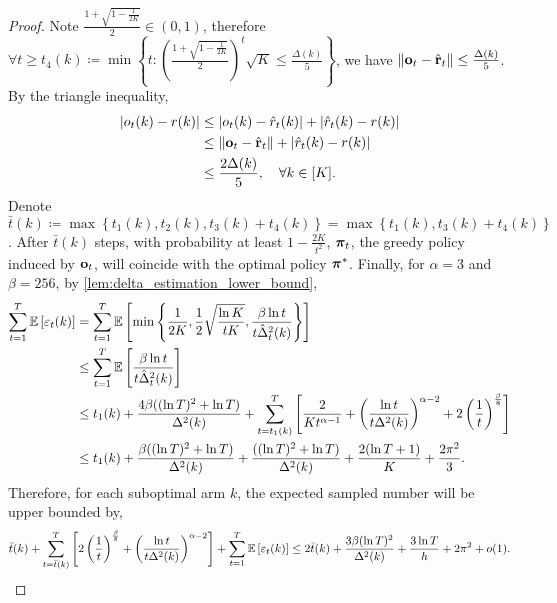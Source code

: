 \begin{proof}
	Note $\frac{1 + \sqrt{1 - \frac{1}{2 K}}}{2} \in \left(0, 1\right)$, therefore $\forall t \ge t_4(k) \coloneqq \min{\left\{ t : \left( \frac{1 + \sqrt{1 - \frac{1}{2 K}}}{2} \right)^t \sqrt{K} \le \frac{\Delta(k)}{5}  \right\}}$, we have $\| {\mathbf{o}}_t  - \hat{{\mathbf{r}}}_t\| \le \frac{\Delta(k)}{5}$. By the triangle inequality,
	\begin{equation*}
	\begin{split}
	| o_t(k) - r(k) | &\le | o_t(k) - \hat{r}_t(k) | + | \hat{r}_t(k) - r(k) | \\
	&\le \| {\mathbf{o}}_t - \hat{{\mathbf{r}}}_t\| + | \hat{r}_t(k) - r(k) | \\
	&\le \frac{2 \Delta(k)}{5}, \quad \forall k \in [K].
	\end{split}
	\end{equation*}
	Denote $\bar{t}(k) \coloneqq \max\left\{ t_1(k), t_2(k), t_3(k) + t_4(k) \right\} = \max\left\{ t_1(k), t_3(k) + t_4(k) \right\} $. After $\bar{t}(k)$ steps, with probability at least $1 - \frac{2 K}{t^2}$, ${\boldsymbol{\pi}}_t$, the greedy policy induced by ${\mathbf{o}}_t$, will coincide with the optimal policy ${\boldsymbol{\pi}}^*$. Finally, for $\alpha = 3$ and $\beta = 256$, by \cref{lem:delta_estimation_lower_bound},
	\begin{equation*}
	\begin{split}
	\sum\limits_{t=1}^{T}{ \operatorname*{{\mathbb{E}}}{ \left[ \varepsilon_t(k) \right]} } &= \sum\limits_{t=1}^{T}{ \operatorname*{{\mathbb{E}}}{ \left[ \min\left\{ \frac{1}{2 K}, \frac{1}{2} \sqrt{\frac{\ln{K}}{ t K}},  \frac{\beta \ln{t}}{t \hat{\Delta}_t^2(k)} \right\} \right]} } \\
	&\le \sum\limits_{t=1}^{T}{ \operatorname*{{\mathbb{E}}}{ \left[  \frac{\beta \ln{t}}{t \hat{\Delta}_t^2(k)} \right]} } \\
	&\le t_1(k) + \frac{ 4 \beta ( ( \ln{T})^2 + \ln{T} )}{\Delta^2(k)} + \sum\limits_{t = t_1(k)}^{T}{ \left[ \frac{2}{ K t^{\alpha-1}} + \left( \frac{\ln{t}}{t \Delta^2(k)} \right)^{\alpha - 2} + 2 \left(\frac{1}{t}\right)^{\frac{\beta}{8}} \right] } \\
	&\le t_1(k) + \frac{\beta ( ( \ln{T})^2 + \ln{T} )}{\Delta^2(k)} + \frac{ ( ( \ln{T})^2 + \ln{T} )}{\Delta^2(k)} + \frac{2 ( \ln{T} + 1)}{K} + \frac{2 \pi^2}{3}.
	\end{split}
	\end{equation*}
	Therefore, for each suboptimal arm $k$, the expected sampled number will be upper bounded by,
	\begin{equation*}
	\begin{split}
	\bar{t}(k) + \sum\limits_{t = \bar{t}(k) }^{T}{ \left[ 2 \left(\frac{1}{t}\right)^{\frac{\beta}{8}} + \left( \frac{\ln{t}}{t \Delta^2(k)} \right)^{\alpha - 2} \right] } + \sum\limits_{t=1}^{T}{ \expectation{ \left[ \varepsilon_t(k) \right]} } \le 2 \bar{t}(k) + \frac{ 3 \beta ( \ln{T} )^2}{\Delta^2(k)} + \frac{3 \ln{T}}{h} + 2 \pi^2 + o(1).

\end{split}
\end{equation*}
\end{proof}
